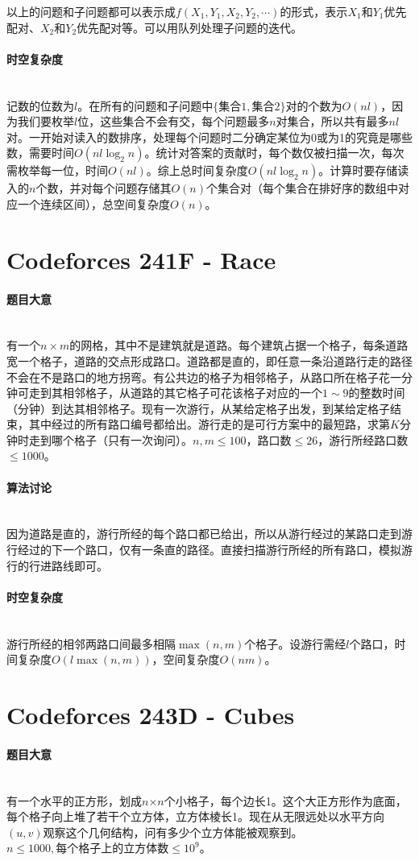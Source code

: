 \documentclass[UTF8]{ctexart}
\newcommand{\myparagraph}[1]{\paragraph{#1}\mbox{}\\}
\theoremstyle{nonumberplain}
\begin{document}
			以上的问题和子问题都可以表示成$f({X_1,Y_1},{X_2,Y_2},\cdots)$的形式，表示$X_1$和$Y_1$优先配对、$X_2$和$Y_2$优先配对等。可以用队列处理子问题的迭代。
		
		\myparagraph{时空复杂度}
		
			记数的位数为$l$。在所有的问题和子问题中$\{\mbox{集合}1,\mbox{集合}2\}$对的个数为$O(nl)$，因为我们要枚举$l$位，这些集合不会有交，每个问题最多$n$对集合，所以共有最多$nl$对。一开始对读入的数排序，处理每个问题时二分确定某位为0或为1的究竟是哪些数，需要时间$O(nl\log_2n)$。统计对答案的贡献时，每个数仅被扫描一次，每次需枚举每一位，时间$O(nl)$。综上总时间复杂度$O(nl\log_2n)$。计算时要存储读入的$n$个数，并对每个问题存储其$O(n)$个集合对（每个集合在排好序的数组中对应一个连续区间），总空间复杂度$O(n)$。
	
	\section{Codeforces 241F - Race}
	
		\myparagraph{题目大意}
		
			有一个$n \times m$的网格，其中不是建筑就是道路。每个建筑占据一个格子，每条道路宽一个格子，道路的交点形成路口。道路都是直的，即任意一条沿道路行走的路径不会在不是路口的地方拐弯。有公共边的格子为相邻格子，从路口所在格子花一分钟可走到其相邻格子，从道路的其它格子可花该格子对应的一个$1 \sim 9$的整数时间（分钟）到达其相邻格子。现有一次游行，从某给定格子出发，到某给定格子结束，其中经过的所有路口编号都给出。游行走的是可行方案中的最短路，求第$K$分钟时走到哪个格子（只有一次询问）。$n,m \leq 100$，路口数$\leq 26$，游行所经路口数$\leq 1000$。
		
		\myparagraph{算法讨论}
		
			因为道路是直的，游行所经的每个路口都已给出，所以从游行经过的某路口走到游行经过的下一个路口，仅有一条直的路径。直接扫描游行所经的所有路口，模拟游行的行进路线即可。
		
		\myparagraph{时空复杂度}
		
			游行所经的相邻两路口间最多相隔$\max(n,m)$个格子。设游行需经$l$个路口，时间复杂度$O(l\max(n,m))$，空间复杂度$O(nm)$。
	
	\section{Codeforces 243D - Cubes}
	
		\myparagraph{题目大意}
		
			有一个水平的正方形，划成$n$×$n$个小格子，每个边长1。这个大正方形作为底面，每个格子向上堆了若干个立方体，立方体棱长1。现在从无限远处以水平方向$(u,v)$观察这个几何结构，问有多少个立方体能被观察到。$n \leq 1000, \mbox{每个格子上的立方体数} \leq 10^9$。
		
\end{document}
